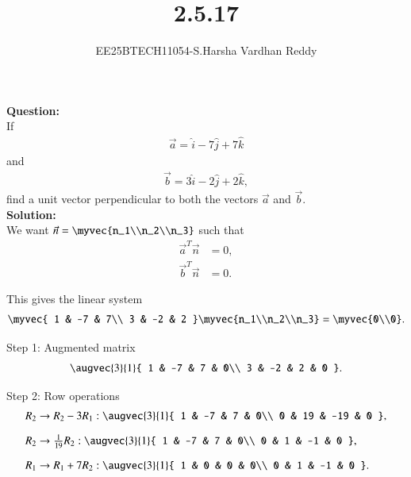 \documentclass[journal]{IEEEtran}
\begin{document}

\vspace{3cm}

\title{2.5.17}
\author{EE25BTECH11054-S.Harsha Vardhan Reddy}
 \maketitle
{\let\newpage\relax\maketitle}

\renewcommand{\thefigure}{\theenumi}
\renewcommand{\thetable}{\theenumi}
\setlength{\intextsep}{10pt} %


\renewcommand{\thetable}{\theenumi}
\noindent
\textbf{Question:}\\
If
\begin{align}
\vec{a} = \hat{i} - 7\hat{j} + 7\hat{k}
\end{align}
and
\begin{align}
\vec{b} = 3\hat{i} - 2\hat{j} + 2\hat{k},
\end{align}
find a unit vector perpendicular to both the vectors $\vec{a}$ and $\vec{b}$.\\
\textbf{Solution:}\\
We want $\vec{n} = \myvec{n_1\\n_2\\n_3}$ such that
\begin{align}
\vec{a}^T \vec{n} &= 0, \label{eq:orth1}\\
\vec{b}^T \vec{n} &= 0. \label{eq:orth2}
\end{align}

This gives the linear system
\begin{align}
\myvec{
1 & -7 & 7\\
3 & -2 & 2
}
\myvec{n_1\\n_2\\n_3}
= \myvec{0\\0}. \label{eq:system}
\end{align}

Step 1: Augmented matrix
\begin{align}
\augvec{3}{1}{
1 & -7 & 7 & 0\\
3 & -2 & 2 & 0
}. \label{eq:aug}
\end{align}

Step 2: Row operations
\begin{align}
R_2 &\to R_2 - 3R_1: 
\augvec{3}{1}{
1 & -7 & 7 & 0\\
0 & 19 & -19 & 0
}, \label{eq:row1}\\[6pt]
R_2 &\to \tfrac{1}{19}R_2: 
\augvec{3}{1}{
1 & -7 & 7 & 0\\
0 & 1 & -1 & 0
}, \label{eq:row2}\\[6pt]
R_1 &\to R_1 + 7R_2: 
\augvec{3}{1}{
1 & 0 & 0 & 0\\
0 & 1 & -1 & 0
}. \label{eq:row3}
\end{align}
\end{document}
